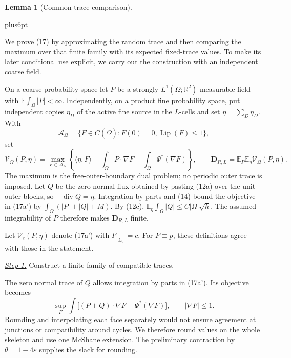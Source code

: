 \documentclass[11pt,reqno]{amsart}
\makeatletter
\theoremstyle{plain}
\newtheorem{lemma}[theorem]{Lemma}
\theoremstyle{definition}
\theoremstyle{remark}
\renewenvironment{proof}[1][\proofname]{%
  \par
  \pushQED{\qed}%
  \normalfont
  \topsep6pt plus6pt\relax
  \trivlist
  \item[\hskip\labelsep\slshape #1\@addpunct{.}]%
  \ignorespaces
}{%
  \popQED
  \endtrivlist
  \@endpefalse
}
\DeclareRobustCommand{\qed}{%
  \leavevmode\unskip\penalty9999\hbox{}\nobreak
  \ifmmode
    \makebox[0pt][l]{\qquad\hbox{\qedsymbol}}%
  \else
    \qquad\hbox{\qedsymbol}%
  \fi
}
\renewcommand{\qedsymbol}{\rule[.47pt]{4pt}{6pt}}
\numberwithin{equation}{section}
\newcommand{\1}{\mathbf 1}
\makeatother
\begin{document}
\begin{lemma}[Common-trace comparison]
\end{lemma}

\begin{proof}
We prove (17) by approximating the random trace and then comparing the
maximum over that finite family with its expected fixed-trace values.
To make its later conditional use explicit, we carry out the construction
with an independent coarse field.

On a coarse probability space let $P$ be a strongly
$L^1(\Omega;\mathbb R^2)$-measurable field with
$\mathbb E\int_ \Omega|P|<\infty$.  Independently, on a product fine
probability space, put independent copies $\eta_ D$ of the active
fine source in the $L$-cells and set $\eta=\sum_ D\eta_ D$.  With
\begin{equation*}
\mathscr A_ \Omega=\{F\in C(\overline\Omega):F(0)=0,
\operatorname {Lip}(F)\leq1\},
\end{equation*}
set
\begin{equation}
\mathcal V_ \Omega(P,\eta)=
\max_ {F\in\mathscr A_ \Omega}
\left\{\langle\eta,F\rangle+
\int_ \Omega P\cdot\nabla F-
\int_ \Omega\Psi^*(\nabla F)\right\},\qquad
\mathbf D_ {R,L}=\mathbb E_ P\mathbb E_ \eta
\mathcal V_ \Omega(P,\eta).
\tag{17a'}
\end{equation}
The maximum is the free-outer-boundary dual problem; no periodic outer
trace is imposed.  Let $Q$ be the zero-normal flux obtained by pasting
(12a) over the unit outer blocks, so $-\operatorname{div}Q=\eta$.
Integration by parts and (14) bound the objective in (17a') by
$\int_\Omega(|P|+|Q|+M)$.  By (12c),
$\mathbb E_\eta\int_\Omega|Q|\leq C|\Omega|\sqrt h$.
The assumed integrability of $P$ therefore makes $\mathbf D_ {R,L}$ finite.

Let $\mathcal V_c(P,\eta)$ denote (17a') with
$F|_{\Sigma_L}=c$.  For $P\equiv p$, these definitions agree with
those in the statement.

\smallskip\noindent
\underline{\textit{Step 1.}} Construct a finite family of compatible traces.

The zero normal trace of $Q$ allows integration by parts in (17a').
Its objective becomes
\begin{equation}
\sup_ F\int\bigl[(P+Q)\cdot\nabla F-\Psi^*(\nabla F)\bigr],
\qquad |\nabla F|\leq1.
\tag{20}
\end{equation}
Rounding and interpolating each face separately would not ensure agreement
at junctions or compatibility around cycles.  We therefore round values
on the whole skeleton and use one McShane extension.  The preliminary
contraction by $\theta=1-4\varepsilon$ supplies the slack for rounding.


\end{proof}
\end{document}
